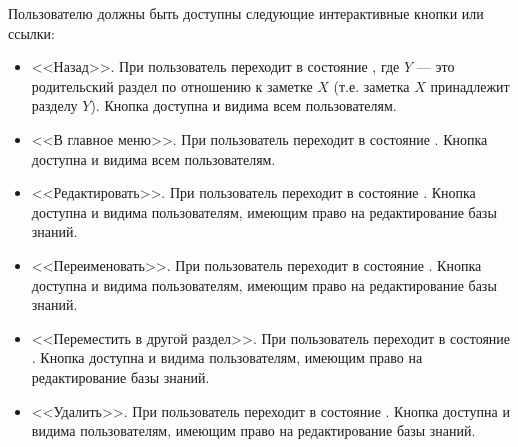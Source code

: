 \begin{enumerate}
            Пользователю должны быть доступны следующие интерактивные кнопки или ссылки:
            \begin{itemize}
                \item
                    <<Назад>>.
                    При  пользователь переходит в состояние
                    \hyperref[itm:req:ui:states:navx]
                    {}, где \(Y\)
                    --- это родительский раздел по отношению к заметке \(X\)
                    (т.е. заметка \(X\) принадлежит разделу \(Y\)).
                    Кнопка доступна и видима всем пользователям.
                \item
                    <<В главное меню>>.
                    При  пользователь переходит в состояние
                    \hyperref[itm:req:ui:states:mainmenu]
                    {}.
                    Кнопка доступна и видима всем пользователям.
                \item
                    <<Редактировать>>.
                    При  пользователь переходит в состояние
                    \hyperref[itm:req:ui:states:edit-note]
                    {}.
                    Кнопка доступна и видима пользователям, имеющим право на редактирование базы знаний.
                \item
                    <<Переименовать>>.
                    При  пользователь переходит в состояние
                    \hyperref[itm:req:ui:states:rename-kbo]
                    {}.
                    Кнопка доступна и видима пользователям, имеющим право на редактирование базы знаний.
                \item
                    <<Переместить в другой раздел>>.
                    При  пользователь переходит в состояние
                    \hyperref[itm:req:ui:states:move-kbo]
                    {}.
                    Кнопка доступна и видима пользователям, имеющим право на редактирование базы знаний.
                \item
                    <<Удалить>>.
                    При  пользователь переходит в состояние
                    \hyperref[itm:req:ui:states:delete-kbo]
                    {}.
                    Кнопка доступна и видима пользователям, имеющим право на редактирование базы знаний.

\end{itemize}
\end{enumerate}

